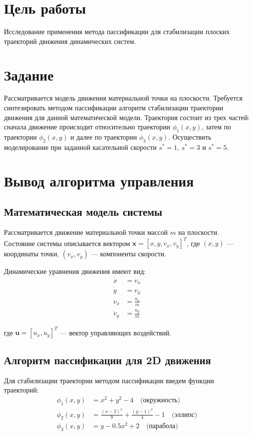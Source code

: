 \documentclass[a4paper,14pt,oneside,openany]{memoir}
\begin{document}
\section{Цель работы}

Исследование применения метода пассификации для стабилизации плоских траекторий движения динамических систем.

\section{Задание}

Рассматривается модель движения материальной точки на плоскости. Требуется синтезировать методом пассификации алгоритм стабилизации траектории движения для данной математической модели. Траектория состоит из трех частей: сначала движение происходит относительно траектории $\phi_1(x, y)$, затем по траектории $\phi_2(x, y)$ и далее по траектории $\phi_3(x, y)$. Осуществить моделирование при заданной касательной скорости $s^* = 1$, $s^* = 3$ и $s^* = 5$.

\section{Вывод алгоритма управления}

\subsection{Математическая модель системы}

Рассматривается движение материальной точки массой $m$ на плоскости. Состояние системы описывается вектором $\mathbf{x} = [x, y, v_x, v_y]^T$, где $(x, y)$ --- координаты точки, $(v_x, v_y)$ --- компоненты скорости.

Динамические уравнения движения имеют вид:
\begin{align}
\dot{x} &= v_x \\
\dot{y} &= v_y \\
\dot{v}_x &= \frac{u_x}{m} \\
\dot{v}_y &= \frac{u_y}{m}
\end{align}

где $\mathbf{u} = [u_x, u_y]^T$ --- вектор управляющих воздействий.

\subsection{Алгоритм пассификации для 2D движения}

Для стабилизации траектории методом пассификации введем функции траекторий:
\begin{align}
\phi_1(x, y) &= x^2 + y^2 - 4 \quad \text{(окружность)} \\
\phi_2(x, y) &= \frac{(x-2)^2}{9} + \frac{(y-1)^2}{4} - 1 \quad \text{(эллипс)} \\
\phi_3(x, y) &= y - 0.5x^2 + 2 \quad \text{(парабола)}
\end{align}
\end{document}
